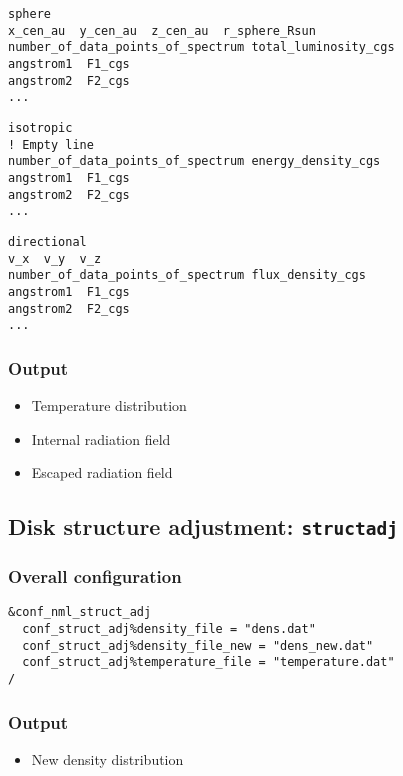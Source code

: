\documentclass{article}
\newcommand{\structadj}{\texttt{structadj}}
\begin{document}
\begin{lstlisting}
sphere
x_cen_au  y_cen_au  z_cen_au  r_sphere_Rsun
number_of_data_points_of_spectrum total_luminosity_cgs
angstrom1  F1_cgs
angstrom2  F2_cgs
...
\end{lstlisting}

\begin{lstlisting}
isotropic
! Empty line
number_of_data_points_of_spectrum energy_density_cgs
angstrom1  F1_cgs
angstrom2  F2_cgs
...
\end{lstlisting}

\begin{lstlisting}
directional
v_x  v_y  v_z
number_of_data_points_of_spectrum flux_density_cgs
angstrom1  F1_cgs
angstrom2  F2_cgs
...
\end{lstlisting}

\subsubsection{Output}

\begin{itemize}
  \item Temperature distribution
  \item Internal radiation field
  \item Escaped radiation field
\end{itemize}  

\subsection{Disk structure adjustment: \structadj}

\subsubsection{Overall configuration}

\begin{lstlisting}
&conf_nml_struct_adj
  conf_struct_adj%density_file = "dens.dat"
  conf_struct_adj%density_file_new = "dens_new.dat"
  conf_struct_adj%temperature_file = "temperature.dat"
/
\end{lstlisting}

\subsubsection{Output}

\begin{itemize}
  \item New density distribution
\end{itemize}  
\end{document}
